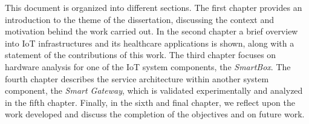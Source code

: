 This document is organized into different sections. The first chapter provides an introduction to the theme of the dissertation, discussing the context and motivation behind the work carried out. In the second chapter a brief overview into \acs{IoT} infrastructures and its healthcare applications is shown, along with a statement of the contributions of this work. The third chapter focuses on hardware analysis for one of the \acs{IoT} system components, the \textit{SmartBox}. The fourth chapter describes the service architecture within another system component, the \textit{Smart Gateway}, which is validated experimentally and analyzed in the fifth chapter.
Finally, in the sixth and final chapter, we reflect upon the work developed and discuss the completion of the objectives and on future work.
